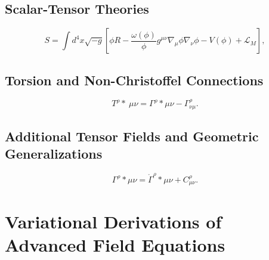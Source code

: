 \documentclass[11pt, a4paper]{report}
\begin{document}
\subsection{Scalar-Tensor Theories}
\begin{equation}
S = \int d^{4}x \sqrt{-g} \left[ \phi R - \frac{\omega(\phi)}{\phi} g^{\mu\nu}\nabla_{\mu}\phi\nabla_{\nu}\phi - V(\phi) + \mathcal{L}_{M} \right],
\end{equation}

\subsection{Torsion and Non-Christoffel Connections}
\begin{equation}
T^{\rho}*{\ \mu\nu} = \Gamma^{\rho}*{\mu\nu} - \Gamma^{\rho}_{\nu\mu}.
\end{equation}

\subsection{Additional Tensor Fields and Geometric Generalizations}
\begin{equation}
\Gamma^{\rho}*{\mu\nu} = \mathring{\Gamma}^{\rho}*{\mu\nu} + C^{\rho}_{\mu\nu}.
\end{equation}

\section{Variational Derivations of Advanced Field Equations}
\end{document}
